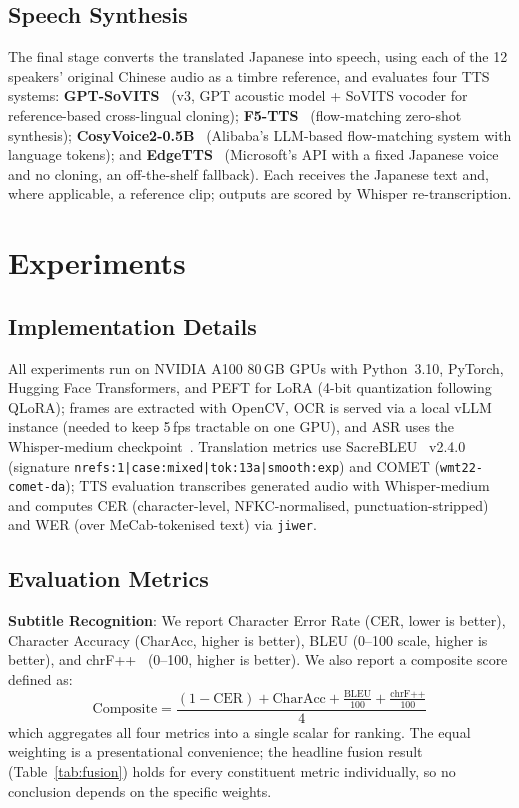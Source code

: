 \documentclass[journal]{IEEEtran}
\begin{document}
\subsection{Speech Synthesis}
\label{sec:tts}

The final stage converts the translated Japanese into speech, using each of the 12 speakers' original Chinese audio as a timbre reference, and evaluates four TTS systems:
\textbf{GPT-SoVITS}~\cite{gptsovits2024} (v3, GPT acoustic model + SoVITS vocoder for reference-based cross-lingual cloning);
\textbf{F5-TTS}~\cite{chen2024f5tts} (flow-matching zero-shot synthesis);
\textbf{CosyVoice2-0.5B}~\cite{cosyvoice2_2024} (Alibaba's LLM-based flow-matching system with language tokens); and
\textbf{EdgeTTS}~\cite{edgetts2024} (Microsoft's API with a fixed Japanese voice and no cloning, an off-the-shelf fallback).
Each receives the Japanese text and, where applicable, a reference clip; outputs are scored by Whisper re-transcription.

\section{Experiments}
\label{sec:experiments}

\subsection{Implementation Details}
All experiments run on NVIDIA A100 80\,GB GPUs with Python~3.10, PyTorch, Hugging Face Transformers, and PEFT for LoRA (4-bit quantization following QLoRA); frames are extracted with OpenCV, OCR is served via a local vLLM instance (needed to keep 5\,fps tractable on one GPU), and ASR uses the Whisper-medium checkpoint~\cite{radford2023robust}.
Translation metrics use SacreBLEU~\cite{post2018sacrebleu} v2.4.0 (signature \texttt{nrefs:1|case:mixed|tok:13a|smooth:exp}) and COMET (\texttt{wmt22-comet-da}); TTS evaluation transcribes generated audio with Whisper-medium and computes CER (character-level, NFKC-normalised, punctuation-stripped) and WER (over MeCab-tokenised text) via \texttt{jiwer}.

\subsection{Evaluation Metrics}
\label{sec:metrics}

\textbf{Subtitle Recognition}: We report Character Error Rate (CER, lower is better), Character Accuracy (CharAcc, higher is better), BLEU (0--100 scale, higher is better), and chrF++~\cite{popovic2015chrf} (0--100, higher is better).
We also report a composite score defined as:
\begin{equation}
\text{Composite} = \frac{(1 - \text{CER}) + \text{CharAcc} + \frac{\text{BLEU}}{100} + \frac{\text{chrF++}}{100}}{4}
\label{eq:composite}
\end{equation}
which aggregates all four metrics into a single scalar for ranking.
The equal weighting is a presentational convenience; the headline fusion result (Table~\ref{tab:fusion}) holds for every constituent metric individually, so no conclusion depends on the specific weights.
\end{document}
